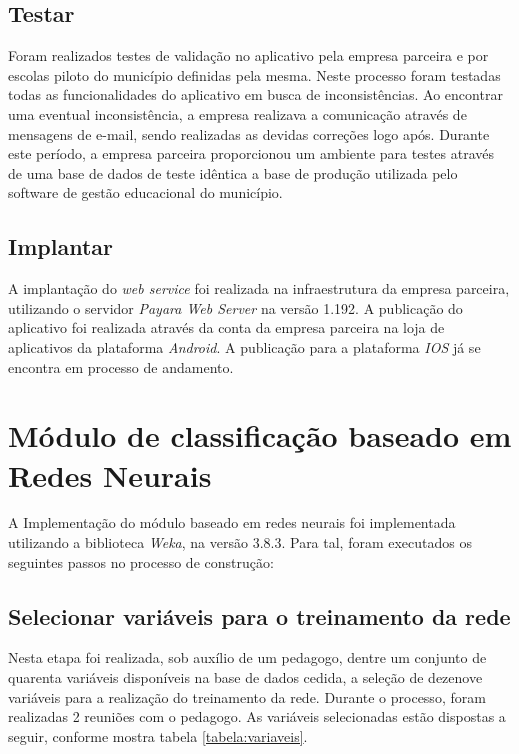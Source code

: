 \subsection{Testar}

Foram realizados testes de validação \cite{pressman2016engenharia} no aplicativo pela empresa parceira e por escolas piloto do município definidas pela mesma. Neste processo foram testadas todas as funcionalidades do aplicativo em busca de inconsistências. Ao encontrar uma eventual inconsistência, a empresa realizava a comunicação através de mensagens de e-mail, sendo realizadas as devidas correções logo após. Durante este período, a empresa parceira proporcionou um ambiente para testes através de uma base de dados de teste idêntica a base de produção utilizada pelo software de gestão educacional do município.

\subsection{Implantar}

A implantação do \textit{web service} foi realizada na infraestrutura da empresa parceira, utilizando o servidor \textit{Payara Web Server} na versão 1.192. A publicação do aplicativo foi realizada através da conta da empresa parceira na loja de aplicativos da plataforma \textit{Android}. A publicação para a plataforma \textit{IOS} já se encontra em processo de andamento.

\section{Módulo de classificação baseado em Redes Neurais}

A Implementação do módulo baseado em redes neurais foi implementada utilizando a biblioteca \textit{Weka}, na versão 3.8.3. Para tal, foram executados os seguintes passos no processo de construção:

\subsection{Selecionar variáveis para o treinamento da rede}

Nesta etapa foi realizada, sob auxílio de um pedagogo, dentre um conjunto de quarenta variáveis disponíveis na base de dados cedida, a seleção de dezenove variáveis para a realização do treinamento da rede. Durante o processo, foram realizadas 2 reuniões com o pedagogo. As variáveis selecionadas estão dispostas a seguir, conforme mostra tabela \ref{tabela:variaveis}. 

